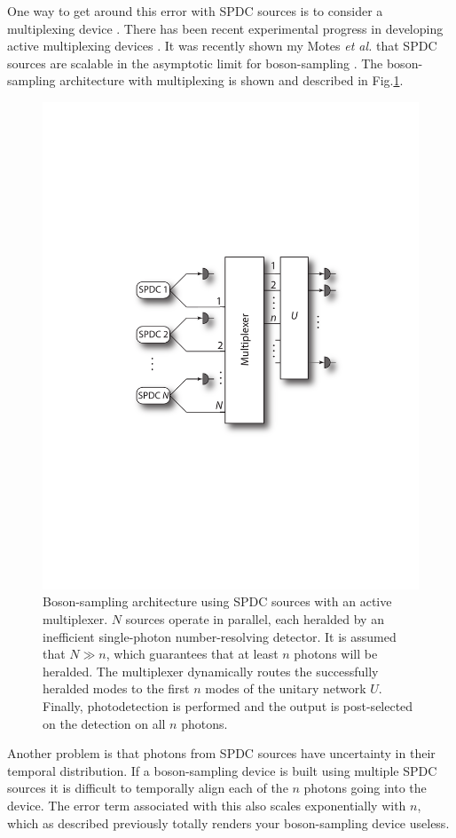\documentclass[aps,pra,twocolumn,amsmath,amssymb,nofootinbib,superscriptaddress]{revtex4}
\begin{document}
One way to get around this error with SPDC sources is to consider a multiplexing device \cite{bib:migdall2002tailoring}. There has been recent experimental progress in developing active multiplexing devices \cite{bib:LPOR201400027, bib:ma2011experimental}. It was recently shown my Motes \emph{et al.} that SPDC sources are scalable in the asymptotic limit for boson-sampling \cite{bib:motes2013spontaneous}. The boson-sampling architecture with multiplexing is shown and described in Fig.\ref{fig:multiplexing}. 

\begin{figure}[!htb]
\includegraphics[width=0.7\columnwidth]{multiplexing}
\caption{Boson-sampling architecture using SPDC sources with an active multiplexer. $N$ sources operate in parallel, each heralded by an inefficient single-photon number-resolving detector. It is assumed that \mbox{$N\gg n$}, which guarantees that at least $n$ photons will be heralded. The multiplexer dynamically routes the successfully heralded modes to the first $n$ modes of the unitary network $U$. Finally, photodetection is performed and the output is post-selected on the detection on all $n$ photons.}
\label{fig:multiplexing}
\end{figure}

Another problem is that photons from SPDC sources have uncertainty in their temporal distribution. If a boson-sampling device is built using multiple SPDC sources it is difficult to temporally align each of the $n$ photons going into the device. The error term associated with this also scales exponentially with $n$, which as described previously totally renders your boson-sampling device useless. 
\end{document}
